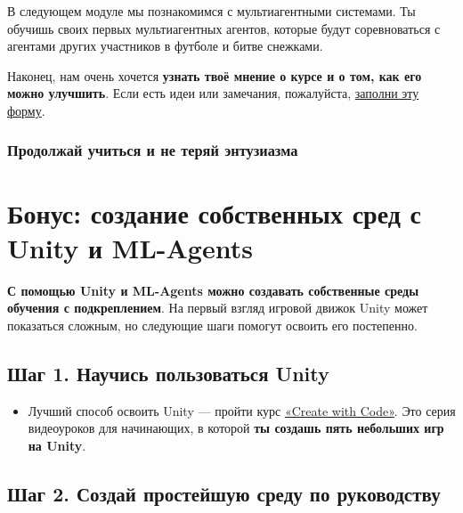 \documentclass[11pt,a4paper]{article}
\begin{document}
В следующем модуле мы познакомимся с мультиагентными системами. Ты обучишь своих первых мультиагентных агентов, которые будут соревноваться с агентами других участников в футболе и битве снежками.


Наконец, нам очень хочется \textbf{узнать твоё мнение о курсе и о том, как его можно улучшить}. Если есть идеи или замечания, пожалуйста, \href{https://forms.gle/BzKXWzLAGZESGNaE9}{заполни эту форму}.

\subsubsection{Продолжай учиться и не теряй энтузиазма}\label{keep-learning-stay-awesome-1}

\enlargethispage{3\baselineskip}
\begingroup\small\setlength{\parskip}{0.15em}
\section{Бонус: создание собственных сред с Unity и ML-Agents}\label{bonus-learn-to-create-your-own-environments-with-unity-and-mlagents}

\textbf{С помощью Unity и ML-Agents можно создавать собственные среды обучения с подкреплением}. На первый взгляд игровой движок Unity может показаться сложным, но следующие шаги помогут освоить его постепенно.

\subsection{Шаг 1. Научись пользоваться Unity}\label{step-1-know-how-to-use-unity}

\begin{itemize}
\tightlist
\item
  Лучший способ освоить Unity --- пройти курс \href{https://learn.unity.com/course/create-with-code}{«Create with Code»}. Это серия видеоуроков для начинающих, в которой \textbf{ты создашь пять небольших игр на Unity}.
\end{itemize}

\subsection{Шаг 2. Создай простейшую среду по руководству}\label{step-2-create-the-simplest-environment-with-this-tutorial}
\end{document}
